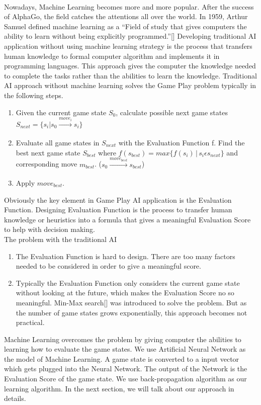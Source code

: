 \documentclass{report}
\begin{document}
	\\
	Nowadays, Machine Learning becomes more and more popular. After the success of AlphaGo, the field catches the attentions all over the world.  In 1959, Arthur Samuel defined machine
	learning as a ``Field of study that gives computers the ability to learn without being explicitly programmed.''[] Developing traditional AI application without using machine learning
	strategy is the process that transfers human knowledge to formal computer algorithm and implements it in programming languages. This approach gives the computer the knowledge needed
	to complete the tasks rather than the abilities to learn the knowledge. Traditional AI approach without machine learning solves the Game Play problem typically in the following steps.
	\begin{enumerate}
		\item Given the current game state $S_0$, calculate possible next game states $S_{next} = \{s_i|s_0\xrightarrow[]{move_i}s_i\}$

		\item Evaluate all game states in $S_{next}$ with the Evaluation Function f. Find the best next game state $S_{best}$ where $f(s_{best}) = max\{f(s_i)\,|\,s_i \epsilon s_{next}\}$ and corresponding
			move $m_{best}$. ($s_0 \xrightarrow[]{move_{best}} s_{best}$)
		\item Apply $move_{best}$.
	\end{enumerate}
	Obviously the key element in Game Play AI application is the Evaluation Function.  Designing Evaluation Function is the process to transfer human knowledge or heuristics into a formula
	that gives a meaningful Evaluation Score to help with decision making.\\
	The problem with the traditional AI
	\begin{enumerate}
		\item The Evaluation Function is hard to design. There are too many factors needed to be considered in order to give a meaningful score. 
		\item Typically the Evaluation Function only considers the current game state without looking at the future, which makes the Evaluation Score no so meaningful.  Min-Max search[]
		was introduced to solve the problem. But as the number of game states grows exponentially, this approach becomes not practical.
	\end{enumerate}
	Machine Learning overcomes the problem by giving computer the abilities to learning how to evaluate the game states. We use Artificial Neural Network as the model of Machine Learning. A
	game state is converted to a input vector which gets plugged into the Neural Network. The output of the Network is the Evaluation Score of the game state. We use back-propagation algorithm
	as our learning algorithm. In the next section, we will talk about our approach in details.\\
\end{document}
